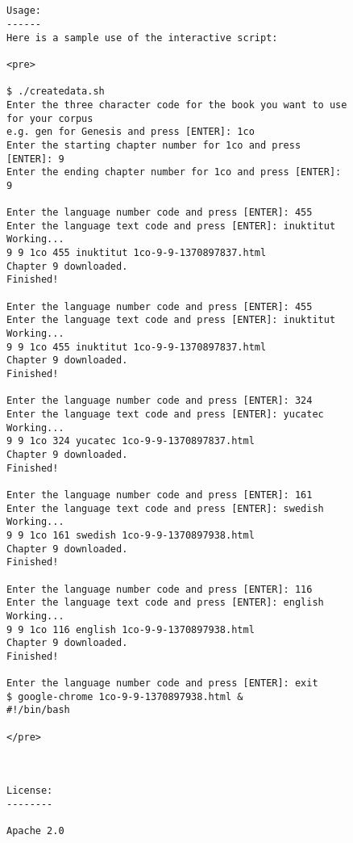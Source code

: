 \documentclass[12pt]{article}
\begin{document}
\begin{figure}
\begin{verbatim}


Usage: 
------
Here is a sample use of the interactive script:

<pre>

$ ./createdata.sh
Enter the three character code for the book you want to use for your corpus
e.g. gen for Genesis and press [ENTER]: 1co
Enter the starting chapter number for 1co and press [ENTER]: 9
Enter the ending chapter number for 1co and press [ENTER]: 9

Enter the language number code and press [ENTER]: 455
Enter the language text code and press [ENTER]: inuktitut
Working...
9 9 1co 455 inuktitut 1co-9-9-1370897837.html
Chapter 9 downloaded.
Finished!

Enter the language number code and press [ENTER]: 455
Enter the language text code and press [ENTER]: inuktitut
Working...
9 9 1co 455 inuktitut 1co-9-9-1370897837.html
Chapter 9 downloaded.
Finished!

Enter the language number code and press [ENTER]: 324
Enter the language text code and press [ENTER]: yucatec
Working...
9 9 1co 324 yucatec 1co-9-9-1370897837.html
Chapter 9 downloaded.
Finished!

Enter the language number code and press [ENTER]: 161
Enter the language text code and press [ENTER]: swedish
Working...
9 9 1co 161 swedish 1co-9-9-1370897938.html
Chapter 9 downloaded.
Finished!

Enter the language number code and press [ENTER]: 116
Enter the language text code and press [ENTER]: english
Working...
9 9 1co 116 english 1co-9-9-1370897938.html
Chapter 9 downloaded.
Finished!

Enter the language number code and press [ENTER]: exit
$ google-chrome 1co-9-9-1370897938.html &
#!/bin/bash

</pre>



License:
--------

Apache 2.0 

\end{verbatim}
\end{figure}
\end{document}
